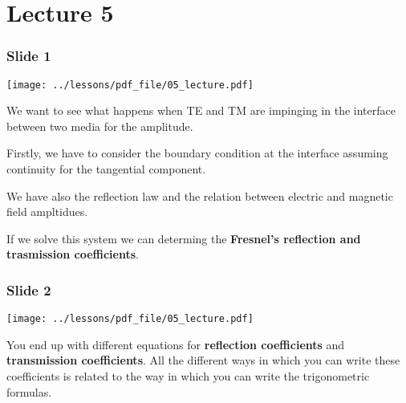\documentclass[../main/main.tex]{subfiles}
\begin{document}
\pagestyle{plain}

\section{Lecture 5}


\subsubsection*{Slide 1}

\begin{minipage}[]{0.5\linewidth}
\centering
\texttt{[image: ../lessons/pdf\_file/05\_lecture.pdf]}
\end{minipage}
\hspace{0.3cm}\vspace{0.3cm}
\begin{minipage}[c]{0.47\linewidth}

We want to see what happens when TE and TM are impinging in the interface between two media for the amplitude.

Firstly, we have to consider the boundary condition at the interface assuming continuity for the tangential component.

We have also the reflection law and the relation between electric and magnetic field ampltidues.

If we solve this system we can determing the \textbf{Fresnel's reflection and trasmission coefficients}.

\end{minipage}

\subsubsection*{Slide 2}

\begin{minipage}[]{0.5\linewidth}
\centering
\texttt{[image: ../lessons/pdf\_file/05\_lecture.pdf]}
\end{minipage}
\hspace{0.3cm}\vspace{0.3cm}
\begin{minipage}[c]{0.47\linewidth}

You end up with different equations for \textbf{reflection coefficients} and \textbf{transmission coefficients}. All the different ways in which you can write these coefficients is related to the way in which you can write the trigonometric formulas.

\end{minipage}
\end{document}
